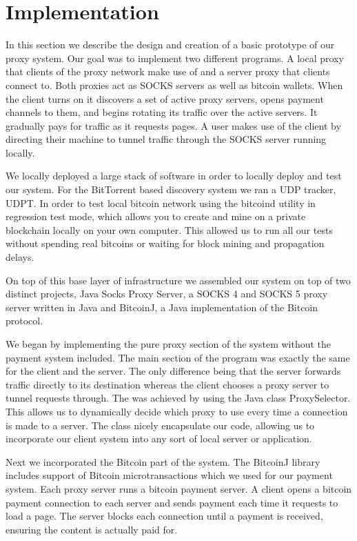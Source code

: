 \section{Implementation}
\label{sec:eval}

In this section we describe the design and creation of a basic prototype of our proxy system. Our goal was to implement two different programs. A local proxy that clients of the proxy network make use of and a server proxy that clients connect to. Both proxies act as SOCKS servers as well as bitcoin wallets. When the client turns on it discovers a set of active proxy servers, opens payment channels to them, and begins rotating its traffic over the active servers. It gradually pays for traffic as it requests pages. A user makes use of the client by directing their machine to tunnel traffic through the SOCKS server running locally.

We locally deployed a large stack of software in order to locally deploy and test our system. For the BitTorrent based discovery system we ran a UDP tracker, UDPT. In order to test local bitcoin network using the bitcoind utility in regression test mode, which allows you to create and mine on a private blockchain locally on your own computer. This allowed us to run all our tests without spending real bitcoins or waiting for block mining and propagation delays.
	
On top of this base layer of infrastructure we assembled our system on top of two distinct projects, Java Socks Proxy Server, a SOCKS 4 and SOCKS 5 proxy server written in Java and BitcoinJ, a Java implementation of the Bitcoin protocol.
	
We began by implementing the pure proxy section of the system without the payment system included. The main section of the program was exactly the same for the client and the server. The only difference being that the server forwards traffic directly to its destination whereas the client chooses a proxy server to tunnel requests through. The was achieved by using the Java class ProxySelector. This allows us to dynamically decide which proxy to use every time a connection is made to a server. The class nicely encapsulate our code, allowing us to incorporate our client system into any sort of local server or application.
	
Next we incorporated the Bitcoin part of the system. The BitcoinJ library includes support of Bitcoin microtransactions which we used for our payment system. Each proxy server runs a bitcoin payment server. A client opens a bitcoin payment connection to each server and sends payment each time it requests to load a page. The server blocks each connection until a payment is received, ensuring the content is actually paid for.
	
